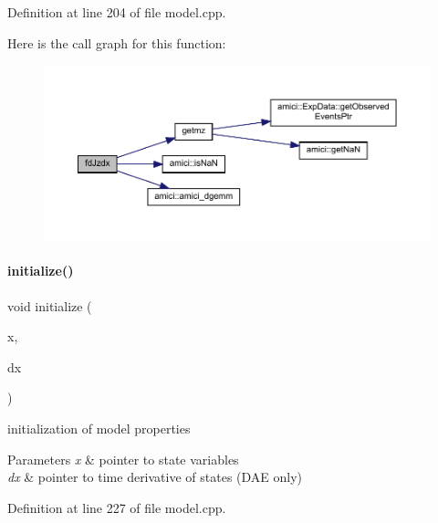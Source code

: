 Definition at line 204 of file model.\+cpp.

Here is the call graph for this function\+:
\nopagebreak
\begin{figure}[H]
\begin{center}
\leavevmode
\includegraphics[width=350pt]{classamici_1_1_model_a588e7cb4790ce3b77700a3acef1c43fc_cgraph}
\end{center}
\end{figure}
\mbox{\label{classamici_1_1_model_a4d8f308f15a126dde571f2e26787d3e8}} 
\paragraph{\texorpdfstring{initialize()}{initialize()}}
{\footnotesize\ttfamily void initialize (\begin{DoxyParamCaption}\item[{\mbox{\hyperlink{classamici_1_1_ami_vector}{Ami\+Vector}} $\ast$}]{x,  }\item[{\mbox{\hyperlink{classamici_1_1_ami_vector}{Ami\+Vector}} $\ast$}]{dx }\end{DoxyParamCaption})}

initialization of model properties 
\begin{DoxyParams}{Parameters}
{\em x} & pointer to state variables \\
\hline
{\em dx} & pointer to time derivative of states (D\+AE only) \\
\hline
\end{DoxyParams}


Definition at line 227 of file model.\+cpp.

